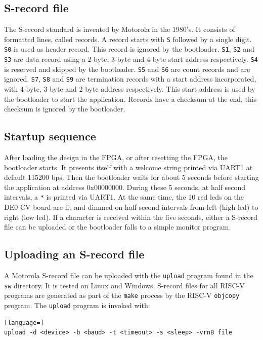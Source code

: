 \documentclass[12pt]{article}
\begin{document}
\subsection{S-record file}
The S-record standard is invented by Motorola in the 1980's. It consists of formatted lines, called records. A record starts with \lstinline|S| followed by a single digit. \lstinline|S0| is used as header record. This record is ignored by the bootloader. \lstinline|S1|,  \lstinline|S2| and \lstinline|S3| are data record using a 2-byte, 3-byte and 4-byte start address respectively. \lstinline|S4| is reserved and skipped by the bootloader. \lstinline|S5| and \lstinline|S6| are count records and are ignored. \lstinline|S7|, \lstinline|S8| and \lstinline|S9| are termination records with a start address incorporated, with 4-byte, 3-byte and 2-byte address respectively. This start address is used by the bootloader to start the application. Records have a checksum at the end, this checksum is ignored by the bootloader.

\subsection{Startup sequence}
After loading the design in the FPGA, or after resetting the FPGA, the bootloader starts. It presents itself with a welcome string printed via UART1 at default 115200 bps. Then the bootloader waits for about 5 seconds before starting the application at address 0x00000000. During these 5 seconds, at half second intervals, a \lstinline|*| is printed via UART1. At the same time, the 10 red leds on the DE0-CV board are lit and dimmed on half second intervals from left (high led) to right (low led). If a character is received within the five seconds, either a S-record file can be uploaded or the bootloader falls to a simple monitor program.

\subsection{Uploading an S-record file}
A Motorola S-record file can be uploaded with the \lstinline|upload| program found in the \lstinline|sw| directory. It is tested on Linux and Windows. S-record files for all RISC-V programs are generated as part of the \lstinline|make| process by the RISC-V \lstinline|objcopy| program. The \lstinline|upload| program is invoked with:

\begin{lstlisting}[language=]
upload -d <device> -b <baud> -t <timeout> -s <sleep> -vrnB file
\end{lstlisting}
\end{document}

